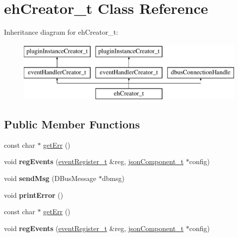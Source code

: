 \hypertarget{classehCreator__t}{\section{eh\-Creator\-\_\-t \-Class \-Reference}
\label{classehCreator__t}
}
\-Inheritance diagram for eh\-Creator\-\_\-t\-:\begin{figure}[H]
\begin{center}
\leavevmode
\includegraphics[height=3.000000cm]{classehCreator__t}
\end{center}
\end{figure}
\subsection*{\-Public \-Member \-Functions}
\begin{DoxyCompactItemize}
\item 
const char $\ast$ \hyperlink{classehCreator__t_aaa2d6c061a4a23eac251c6dee5e10e4b}{get\-Err} ()
\item 
\hypertarget{classehCreator__t_ad5a102976aae3c4f10b6c7f10f94093c}{void {\bfseries reg\-Events} (\hyperlink{classeventRegister__t}{event\-Register\-\_\-t} \&reg, \hyperlink{classjsonComponent__t}{json\-Component\-\_\-t} $\ast$config)}\label{classehCreator__t_ad5a102976aae3c4f10b6c7f10f94093c}

\item 
\hypertarget{classehCreator__t_af267e643e97acbfb8ce48f3b32516e22}{void {\bfseries send\-Msg} (\-D\-Bus\-Message $\ast$dbmsg)}\label{classehCreator__t_af267e643e97acbfb8ce48f3b32516e22}

\item 
\hypertarget{classehCreator__t_aba397e81f4e4150e0afbf9b8d1cebae2}{void {\bfseries print\-Error} ()}\label{classehCreator__t_aba397e81f4e4150e0afbf9b8d1cebae2}

\item 
const char $\ast$ \hyperlink{classehCreator__t_aaa2d6c061a4a23eac251c6dee5e10e4b}{get\-Err} ()
\item 
\hypertarget{classehCreator__t_ad5a102976aae3c4f10b6c7f10f94093c}{void {\bfseries reg\-Events} (\hyperlink{classeventRegister__t}{event\-Register\-\_\-t} \&reg, \hyperlink{classjsonComponent__t}{json\-Component\-\_\-t} $\ast$config)}\label{classehCreator__t_ad5a102976aae3c4f10b6c7f10f94093c}

\end{DoxyCompactItemize}


